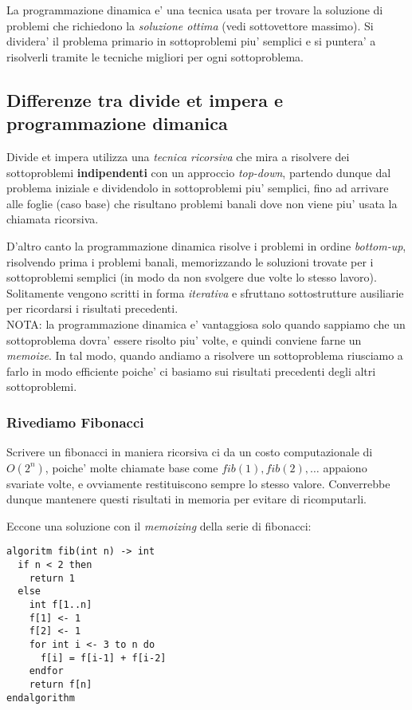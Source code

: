 \documentclass{article}
\begin{document}
La programmazione dinamica e' una tecnica usata per trovare la soluzione di problemi
che richiedono la \emph{soluzione ottima} (vedi sottovettore massimo). Si
dividera' il problema primario in sottoproblemi piu' semplici e si puntera' a
risolverli tramite le tecniche migliori per ogni
sottoproblema.

\subsection{Differenze tra divide et impera e programmazione dimanica}

Divide et impera utilizza una \emph{tecnica ricorsiva} che mira a risolvere dei
sottoproblemi \textbf{indipendenti} con un approccio \emph{top-down}, partendo
dunque dal problema iniziale e dividendolo in sottoproblemi piu' semplici,
fino ad arrivare alle foglie (caso base) che risultano problemi banali dove
non viene piu' usata la chiamata ricorsiva.

D'altro canto la programmazione dinamica risolve i problemi in ordine \emph{bottom-up},
risolvendo prima i problemi banali, memorizzando le soluzioni trovate per i sottoproblemi
semplici (in modo da non svolgere due volte lo stesso lavoro). Solitamente vengono
scritti in forma \emph{iterativa} e sfruttano sottostrutture ausiliarie per ricordarsi
i risultati precedenti. \\
NOTA: la programmazione dinamica e' vantaggiosa solo quando sappiamo che un
sottoproblema dovra' essere risolto piu' volte, e quindi conviene farne un \emph{memoize}.
In tal modo, quando andiamo a risolvere un sottoproblema riusciamo a farlo in modo
efficiente poiche' ci basiamo sui risultati precedenti degli altri sottoproblemi.

\subsubsection{Rivediamo Fibonacci}

Scrivere un fibonacci in maniera ricorsiva ci da un costo computazionale
di $O(2^n)$, poiche' molte chiamate base come $fib(1), fib(2), \ldots$ appaiono
svariate volte, e ovviamente restituiscono sempre lo stesso valore. Converrebbe
dunque mantenere questi risultati in memoria per evitare di ricomputarli.

Eccone una soluzione con il \emph{memoizing} della serie di fibonacci:

\begin{lstlisting}
algoritm fib(int n) -> int
  if n < 2 then
    return 1
  else
    int f[1..n]
    f[1] <- 1
    f[2] <- 1
    for int i <- 3 to n do
      f[i] = f[i-1] + f[i-2]
    endfor
    return f[n]
endalgorithm
\end{lstlisting}
\end{document}
